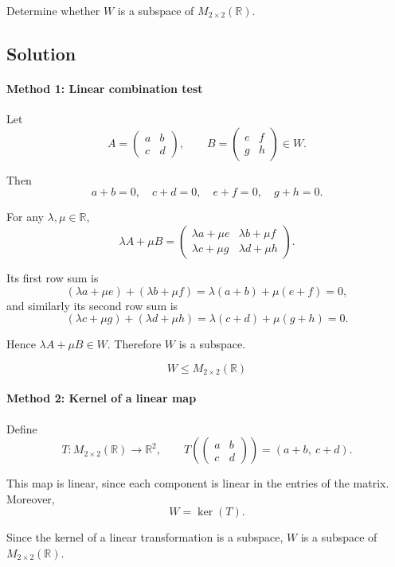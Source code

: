 \documentclass[12pt]{article}
\begin{document}
Determine whether \(W\) is a subspace of \(M_{2\times2}(\mathbb R)\).

\subsection{Solution}

\paragraph{Method 1: Linear combination test}

Let
\[
A=\begin{pmatrix}a&b\\ c&d\end{pmatrix},\qquad
B=\begin{pmatrix}e&f\\ g&h\end{pmatrix}\in W.
\]

Then
\[
a+b=0,\quad c+d=0,\quad e+f=0,\quad g+h=0.
\]

For any \(\lambda,\mu\in\mathbb R\),
\[
\lambda A+\mu B=
\begin{pmatrix}
\lambda a+\mu e & \lambda b+\mu f\\
\lambda c+\mu g & \lambda d+\mu h
\end{pmatrix}.
\]

Its first row sum is
\[
(\lambda a+\mu e)+(\lambda b+\mu f)
=\lambda(a+b)+\mu(e+f)=0,
\]
and similarly its second row sum is
\[
(\lambda c+\mu g)+(\lambda d+\mu h)
=\lambda(c+d)+\mu(g+h)=0.
\]

Hence \(\lambda A+\mu B\in W\). Therefore \(W\) is a subspace.

\[
\boxed{W\le M_{2\times2}(\mathbb R)}
\]

\paragraph{Method 2: Kernel of a linear map}

Define
\[
T:M_{2\times2}(\mathbb R)\to\mathbb R^2,\qquad
T\!\left(\begin{pmatrix}a&b\\ c&d\end{pmatrix}\right)
=(a+b,\ c+d).
\]

This map is linear, since each component is linear in the entries of the matrix. Moreover,
\[
W=\ker(T).
\]

Since the kernel of a linear transformation is a subspace, \(W\) is a subspace of \(M_{2\times2}(\mathbb R)\).
\end{document}
